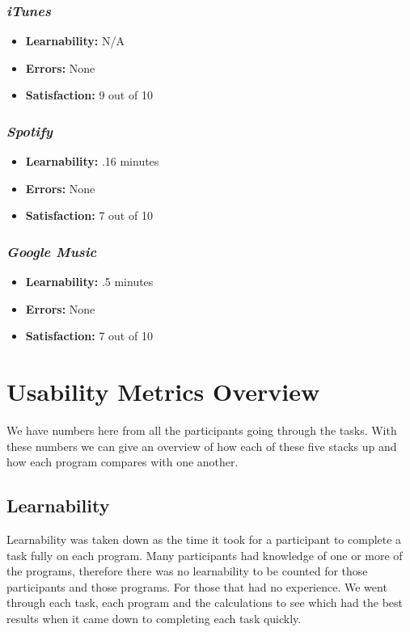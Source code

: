 \documentclass{article}
\begin{document}
\begin{multicols}{2}
\subsubsection{\it iTunes}
\begin{itemize}
	\item {\bf Learnability:} N/A
	\item {\bf Errors:} None
	\item {\bf Satisfaction:} 9 out of 10 
\end{itemize}

\subsubsection{\it Spotify}
\begin{itemize}
	\item {\bf Learnability:} .16 minutes
	\item {\bf Errors:} None
	\item {\bf Satisfaction:} 7 out of 10 
\end{itemize}

\subsubsection{\it Google Music}
\begin{itemize}
\item {\bf Learnability:} .5 minutes
	\item {\bf Errors:} None
	\item {\bf Satisfaction:} 7 out of 10 
\end{itemize}
\end{multicols}

\section{Usability Metrics Overview}
We have numbers here from all the participants going through the tasks. With these numbers we can give an overview of how each of these five stacks up and how each program compares with one another.

\subsection{Learnability}
Learnability was taken down as the time it took for a participant to complete a task fully on each program. Many participants had knowledge of one or more of the programs, therefore there was no learnability to be counted for those participants and those programs. For those that had no experience. We went through each task, each program and the calculations to see which had the best results when it came down to completing each task quickly.
\end{document}
